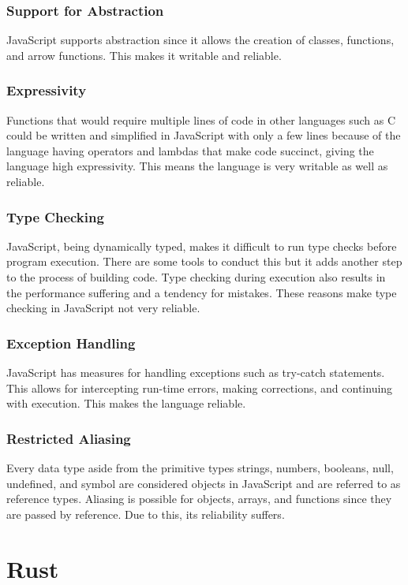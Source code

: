 \documentclass{article}
\begin{document}
  \subsubsection{Support for Abstraction}
  JavaScript supports abstraction since it allows the creation of classes,
  functions, and arrow functions. This makes it writable and reliable.

  \subsubsection{Expressivity}
  Functions that would require multiple lines of code in other languages such as
  C could be written and simplified in JavaScript with only a few lines because
  of the language having operators and lambdas that make code succinct, giving
  the language high expressivity. This means the language is very writable as
  well as reliable.

  \subsubsection{Type Checking}
  JavaScript, being dynamically typed, makes it difficult to run type checks
  before program execution. There are some tools to conduct this but it adds
  another step to the process of building code. Type checking during execution
  also results in the performance suffering and a tendency for mistakes. These
  reasons make type checking in JavaScript not very reliable.

  \subsubsection{Exception Handling}
  JavaScript has measures for handling exceptions such as try-catch statements.
  This allows for intercepting run-time errors, making corrections, and
  continuing with execution. This makes the language reliable.

  \subsubsection{Restricted Aliasing}
  Every data type aside from the primitive types strings, numbers, booleans,
  null, undefined, and symbol are considered objects in JavaScript and are
  referred to as reference types. Aliasing is possible for objects, arrays, and
  functions since they are passed by reference. Due to this, its reliability
  suffers.

  \section{Rust}
\end{document}
